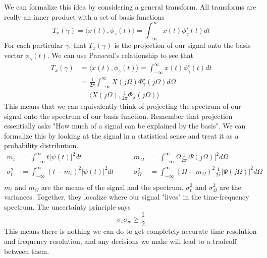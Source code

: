 \documentclass{article}
\begin{document}
We can formalize this idea by considering a general transform. All transforms are really an inner product with a set of basis functions
$$T_x(\gamma) = \langle x(t), \phi_\gamma(t) \rangle=\int_{-\infty}^{\infty}x(t)\phi_\gamma^\star(t)dt$$
For each particular $\gamma$, that $T_x(\gamma)$ is the projection of our signal onto the basis vector $\phi_\gamma(t)$. We can use Parseval's relationship
to see that
\begin{align*}
  T_x(\gamma) &= \langle x(t), \phi_\gamma(t) \rangle =\int_{-\infty}^{\infty}x(t)\phi_\gamma^\star(t)dt \\
  &= \frac{1}{2\pi}\int_{-\infty}^{\infty}X(j\Omega)\Phi_\gamma^\star(j\Omega)d\Omega \\
  &= \langle X(j\Omega), \frac{1}{2\pi}\Phi_\lambda(j\Omega)\rangle
\end{align*}
This means that we can equivalently think of projecting the spectrum of our signal onto the spectrum of our basis function. Remember that projection essentially asks "How much of a signal can be explained by the basis".
We can formalize this by looking at the signal in a statistical sense and treat it as a probability distribution.
\begin{align*}
  m_t &= \int_{-\infty}^{\infty}t|\psi(t)|^2dt &\qquad m_\Omega &= \int_{-\infty}^{\infty}\Omega\frac{1}{2\pi}|\Psi(j\Omega)|^2d\Omega\\
  \sigma_t^2 &= \int_{-\infty}^{\infty}(t-m_t)^2|\psi(t)|^2dt &\qquad \sigma^2_\Omega &= \int_{-\infty}^{\infty}(\Omega-m_\Omega)^2\frac{1}{2\pi}|\Psi(j\Omega)|^2d\Omega\\
\end{align*}
$m_t$ and $m_\Omega$ are the means of the signal and the spectrum. $\sigma_t^2$ and $\sigma_\Omega^2$ are the variances. Together, they localize where our signal "lives" in the time-frequency spectrum.
The uncertainty principle says
$$\sigma_t\sigma_w \ge \frac{1}{2}$$
This means there is nothing we can do to get completely accurate time resolution and frequency resolution, and any decisions we make will
lead to a tradeoff between them.
\end{document}
